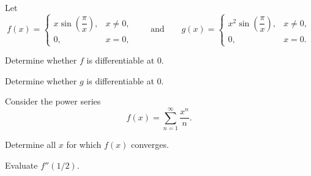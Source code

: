 \begin{problem}
Let
\[
f(x)=
\begin{cases}
x\sin\!\left(\dfrac{\pi}{x}\right), & x\ne0, \\[0.5em]
0, & x=0,
\end{cases}
\qquad
\text{and}
\qquad
g(x)=
\begin{cases}
x^2\sin\!\left(\dfrac{\pi}{x}\right), & x\ne0, \\[0.5em]
0, & x=0.
\end{cases}
\]
\begin{problemsubparts}
\item Determine whether $f$ is differentiable at $0$.
\item Determine whether $g$ is differentiable at $0$.
\end{problemsubparts}
\end{problem}

\begin{problem}
Consider the power series
\[
f(x)=\sum_{n=1}^{\infty}\frac{x^n}{n}.
\]
\begin{problemsubparts}
\item Determine all $x$ for which $f(x)$ converges.
\item Evaluate $f''(1/2)$.
\end{problemsubparts}
\end{problem}

\schoolsection{\KAIST}{\KoreaAdvancedInstituteOfScienceAndTechnology}

